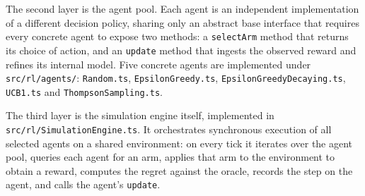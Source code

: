 The second layer is the agent pool. Each agent is an independent implementation of a different decision policy, sharing only an abstract base interface that requires every concrete agent to expose two methods: a \texttt{selectArm} method that returns its choice of action, and an \texttt{update} method that ingests the observed reward and refines its internal model. Five concrete agents are implemented under \texttt{src/rl/agents/}: \texttt{Random.ts}, \texttt{EpsilonGreedy.ts}, \texttt{EpsilonGreedyDecaying.ts}, \texttt{UCB1.ts} and \texttt{ThompsonSampling.ts}.

The third layer is the simulation engine itself, implemented in \texttt{src/rl/SimulationEngine.ts}. It orchestrates synchronous execution of all selected agents on a shared environment: on every tick it iterates over the agent pool, queries each agent for an arm, applies that arm to the environment to obtain a reward, computes the regret against the oracle, records the step on the agent, and calls the agent's \texttt{update}.

